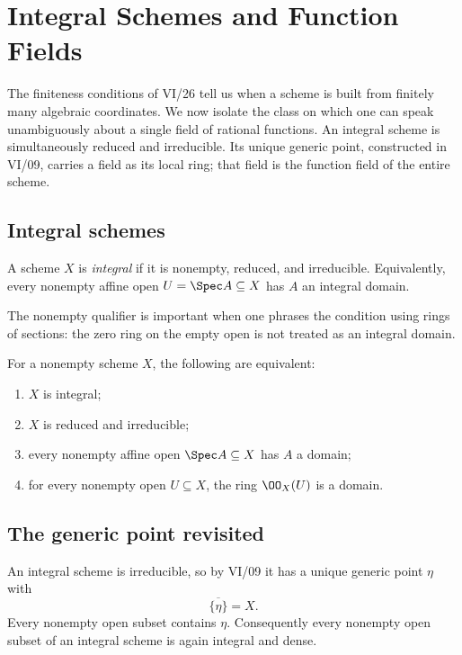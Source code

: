 \chapter{Integral Schemes and Function Fields}\label{ch:vi27-integral-function-fields}

The finiteness conditions of VI/26 tell us when a scheme is built from finitely many algebraic coordinates.  We now
isolate the class on which one can speak unambiguously about a single field of rational functions.  An integral
scheme is simultaneously reduced and irreducible.  Its unique generic point, constructed in VI/09, carries a
field as its local ring; that field is the function field of the entire scheme.

\section{Integral schemes}
\begin{definition}\label{def:vi27-integral}
A scheme $X$ is \emph{integral} if it is nonempty, reduced, and irreducible.  Equivalently, every nonempty affine
open $U=\Spec A\subseteq X$ has $A$ an integral domain.
\end{definition}

The nonempty qualifier is important when one phrases the condition using rings of sections: the zero ring on the
empty open is not treated as an integral domain.

\begin{theorem}\label{thm:vi27-reduced-irreducible}
For a nonempty scheme $X$, the following are equivalent:
\begin{enumerate}[label=(\roman*)]
\item $X$ is integral;
\item $X$ is reduced and irreducible;
\item every nonempty affine open $\Spec A\subseteq X$ has $A$ a domain;
\item for every nonempty open $U\subseteq X$, the ring $\OO_X(U)$ is a domain.
\end{enumerate}
\end{theorem}



\section{The generic point revisited}
An integral scheme is irreducible, so by VI/09 it has a unique generic point $\eta$ with
\[
\overline{\{\eta\}}=X.
\]
Every nonempty open subset contains $\eta$.  Consequently every nonempty open subset of an integral scheme is
again integral and dense.

